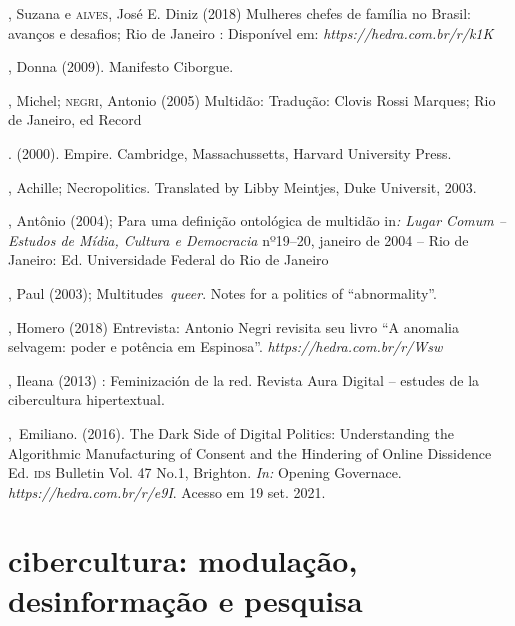 \begin{bibliohedra}
, Suzana e \textsc{alves}, José E. Diniz (2018) Mulheres chefes de
família no Brasil: avanços e desafios; Rio de Janeiro : Disponível em:
\emph{https://hedra.com.br/r/k1K}

, Donna (2009). Manifesto Ciborgue. 

, Michel; \textsc{negri}, Antonio (2005) Multidão: Tradução: Clovis Rossi
Marques; Rio de Janeiro, ed Record

\titidem. (2000). Empire. Cambridge,
Massachussetts, Harvard University Press.

, Achille; Necropolitics. Translated by Libby Meintjes, Duke
Universit, 2003. 

, Antônio (2004); Para uma definição ontológica de multidão
in\emph{: Lugar Comum -- Estudos de Mídia, Cultura e Democracia} nº19--20,
janeiro de 2004 -- Rio de Janeiro: Ed. Universidade Federal do Rio de
Janeiro

, Paul (2003); Multitudes~\emph{queer}. Notes for a politics of
``abnormality''.

, Homero (2018) Entrevista: Antonio Negri revisita seu livro ``A
anomalia selvagem: poder e potência em Espinosa''.
\emph{https://hedra.com.br/r/Wsw}

, Ileana (2013) : Feminización de la red. Revista Aura
Digital -- estudes de la cibercultura hipertextual.

,~Emiliano. (2016). The Dark Side of Digital Politics:
Understanding the Algorithmic Manufacturing of Consent and the Hindering
of Online Dissidence Ed. \textsc{ids} Bulletin Vol. 47 No.1, Brighton. \emph{In:}
Opening Governace. \emph{https://hedra.com.br/r/e9I}. Acesso em 19 set. 2021.
\end{bibliohedra}

\part{cibercultura: modulação, desinformação e pesquisa}



